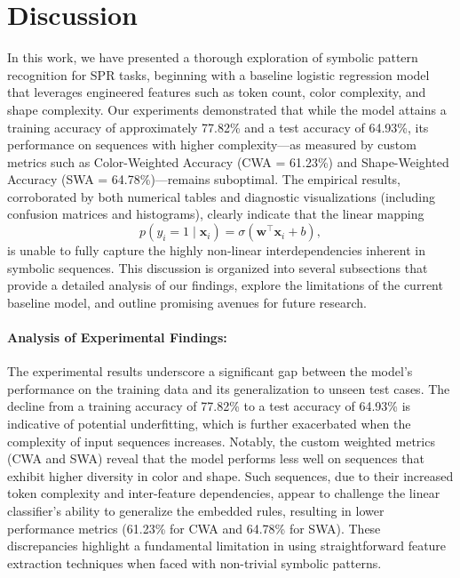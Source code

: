 \documentclass{article}
\begin{document}
\section{Discussion}
In this work, we have presented a thorough exploration of symbolic pattern recognition for SPR tasks, beginning with a baseline logistic regression model that leverages engineered features such as token count, color complexity, and shape complexity. Our experiments demonstrated that while the model attains a training accuracy of approximately 77.82\% and a test accuracy of 64.93\%, its performance on sequences with higher complexity—as measured by custom metrics such as Color-Weighted Accuracy (CWA = 61.23\%) and Shape-Weighted Accuracy (SWA = 64.78\%)—remains suboptimal. The empirical results, corroborated by both numerical tables and diagnostic visualizations (including confusion matrices and histograms), clearly indicate that the linear mapping 
\[
p(y_i = 1 \mid \mathbf{x}_i) = \sigma\left(\mathbf{w}^\top \mathbf{x}_i + b\right),
\]
is unable to fully capture the highly non-linear interdependencies inherent in symbolic sequences. This discussion is organized into several subsections that provide a detailed analysis of our findings, explore the limitations of the current baseline model, and outline promising avenues for future research.

\paragraph{Analysis of Experimental Findings:} The experimental results underscore a significant gap between the model’s performance on the training data and its generalization to unseen test cases. The decline from a training accuracy of 77.82\% to a test accuracy of 64.93\% is indicative of potential underfitting, which is further exacerbated when the complexity of input sequences increases. Notably, the custom weighted metrics (CWA and SWA) reveal that the model performs less well on sequences that exhibit higher diversity in color and shape. Such sequences, due to their increased token complexity and inter-feature dependencies, appear to challenge the linear classifier’s ability to generalize the embedded rules, resulting in lower performance metrics (61.23\% for CWA and 64.78\% for SWA). These discrepancies highlight a fundamental limitation in using straightforward feature extraction techniques when faced with non-trivial symbolic patterns.
\end{document}

